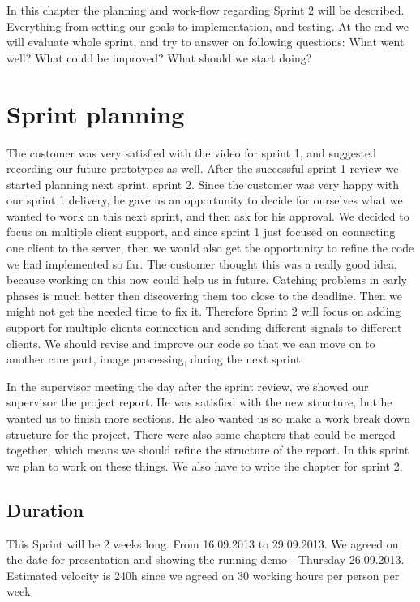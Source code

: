 In this chapter the planning and work-flow regarding Sprint 2 will be described. 
Everything from setting our goals to implementation, and testing. At the end we will evaluate whole sprint, and try to answer on following questions: What went well? What could be improved? What should we start doing? 

\section{Sprint planning}
The customer was very satisfied with the video for sprint 1, and suggested recording our future prototypes as well. 
After the successful sprint 1 review we started planning next sprint, sprint 2. Since the customer was very happy with our sprint 1 delivery, he gave us an opportunity to decide for ourselves what we wanted to work on this next sprint, and then ask for his approval. 
We decided to focus on multiple client support, and since sprint 1 just focused on connecting one client to the server, then we would also get the opportunity to refine the code we had implemented so far. The customer thought this was a really good idea, because working on this now could help us in future. Catching problems in early phases is much better then discovering them too close to the deadline. Then we might not get the needed time to fix it. Therefore Sprint 2 will focus on adding support for multiple clients connection and sending different signals to different clients. We should revise and improve our code so that we can move on to another core part, image processing, during the next sprint.


In the supervisor meeting the day after the sprint review, we showed our supervisor the project report. He was satisfied with the new structure, but he wanted us to finish more sections. He also wanted us so make a work break down structure for the project. There were also some chapters that could be merged together, which means we should refine the structure of the report. In this sprint we plan to work on these things. We also have to write the chapter for sprint 2.

\subsection{Duration}
This Sprint will be 2 weeks long. From 16.09.2013 to 29.09.2013.
We agreed on the date for presentation and showing the running demo - Thursday 26.09.2013.
Estimated velocity is 240h since we agreed on 30 working hours per person per week.

